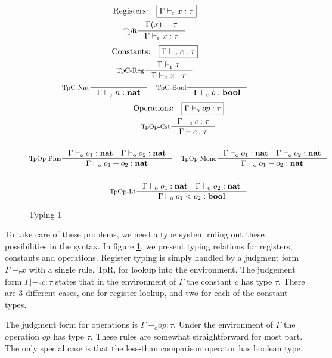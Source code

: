 \documentclass[a4paper, oneside, 10pt, draft]{memoir}
\begin{document}
\newcommand{\tpr}{|-_{\mathrm{r}}}
\newcommand{\tpc}{|-_{\mathrm{c}}}
\newcommand{\tpop}{|-_{\mathrm{o}}}
\newcommand{\tpb}{|-_{\mathrm{b}}}

\begin{figure}
  \begin{gather*}
    \text{Registers:} \quad \boxed{\Gamma \tpr x : \tau}\\
    \inference[TpR]{\Gamma(x) = \tau}{\Gamma \tpr x : \tau}
  \end{gather*}
  \begin{gather*}
    \text{Constants:} \quad \boxed{\Gamma \tpc c : \tau}\\
    \inference[TpC-Reg]{\Gamma \tpr x}{\Gamma \tpc x : \tau}\\
    \inference[TpC-Nat]{}{\Gamma \tpc n : \tnat} \quad
    \inference[TpC-Bool]{}{\Gamma \tpc b : \tbool}
  \end{gather*}
  \begin{gather*}
    \text{Operations:} \quad \boxed{\Gamma \tpop op : \tau} \\
    \inference[TpOp-Cst]{\Gamma \tpc c : \tau}{\Gamma |- c : \tau}\\\\
    \inference[TpOp-Plus]{\Gamma \tpop o_1 : \tnat \quad \Gamma
      \tpop o_2 : \tnat}{\Gamma \tpop o_1 + o_2 : \tnat} \quad
    \inference[TpOp-Mone]{\Gamma \tpop o_1 : \tnat \quad \Gamma
      \tpop o_2 : \tnat}{\Gamma \tpop o_1 - o_2 : \tnat}\\\\
    \inference[TpOp-Lt]{\Gamma \tpop o_1 : \tnat \quad \Gamma
      \tpop o_2 : \tnat}{\Gamma \tpop o_1 < o_2 : \tbool}
  \end{gather*}
  \caption{Typing 1}
  \label{fig:type-judgement-1}
\end{figure}

To take care of these problems, we need a type system ruling out these
possibilities in the syntax. In figure \ref{fig:type-judgement-1}, we
present typing relations for registers, constants and
operations. Register typing is simply handled by a judgment form
$\boxed{\Gamma \tpr x}$ with a single rule, TpR, for lookup into the
environment. The judgement form $\boxed{\Gamma \tpc c : \tau}$ states
that in the environment of $\Gamma$ the constant $c$ has type
$\tau$. There are 3 different cases, one for register lookup, and two
for each of the constant types.

The judgment form for operations is $\boxed{\Gamma \tpop op :
  \tau}$. Under the environment of $\Gamma$ the operation $op$ has
type $\tau$. These rules are somewhat straightforward for most
part. The only special case is that the less-than comparison operator
has boolean type.
\end{document}
